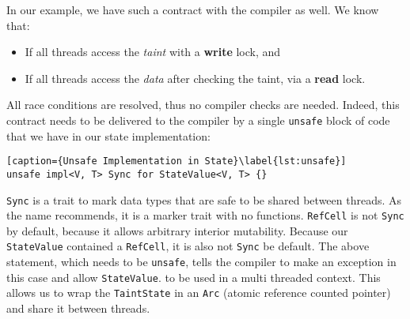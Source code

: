 In our example, we have such a contract with the compiler as well. We know that:

\begin{itemize}
	\item If all threads access the \textit{taint} with a \textbf{write} lock, and
	\item If all threads access the \textit{data} after checking the taint, via a \textbf{read} lock.
\end{itemize}

All race conditions are resolved, thus no compiler checks are needed. Indeed, this contract needs to
be delivered to the compiler by a single \texttt{unsafe} block of code that we have in our state
implementation:

\begin{lstlisting}[caption={Unsafe Implementation in State}\label{lst:unsafe}]
unsafe impl<V, T> Sync for StateValue<V, T> {}
\end{lstlisting}

\texttt{Sync} is a trait to mark data types that are safe to be shared between threads. As the name
recommends, it is a marker trait with no functions. \texttt{RefCell} is not \texttt{Sync} by
default, because it allows arbitrary interior mutability. Because our \texttt{StateValue} contained
a \texttt{RefCell}, it is also not \texttt{Sync} be default. The above statement, which needs to be
\texttt{unsafe}, tells the compiler to make an exception in this case and allow \texttt{StateValue}.
to be used in a multi threaded context. This allows us to wrap the \texttt{TaintState} in an
\texttt{Arc} (atomic reference counted pointer) and share it between threads.





